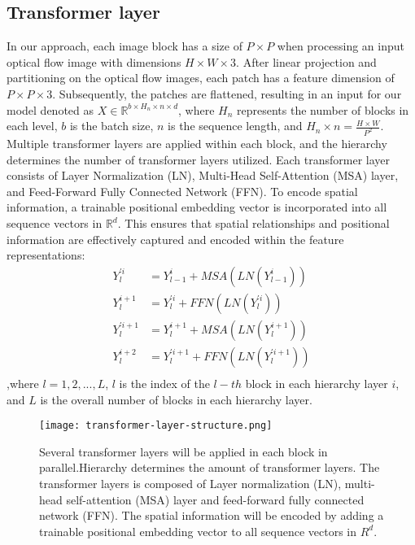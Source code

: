 \documentclass[review,12pt, 3p]{elsarticle}
\begin{document}
\subsection{Transformer layer}
In our approach, each image block has a size of $P \times P$ when processing an input optical flow image with dimensions $H \times W \times 3$. After linear projection and partitioning on the optical flow images, each patch has a feature dimension of $P \times P \times 3$. Subsequently, the patches are flattened, resulting in an input for our model denoted as $X \in \mathbb{R}^{b \times H_n \times n \times d}$, where $H_n$ represents the number of blocks in each level, $b$ is the batch size, $n$ is the sequence length, and $H_n \times n = \frac{H \times W}{P^2}$. Multiple transformer layers are applied within each block, and the hierarchy determines the number of transformer layers utilized. Each transformer layer consists of Layer Normalization (LN), Multi-Head Self-Attention (MSA) layer, and Feed-Forward Fully Connected Network (FFN). To encode spatial information, a trainable positional embedding vector is incorporated into all sequence vectors in $\mathbb{R}^d$. This ensures that spatial relationships and positional information are effectively captured and encoded within the feature representations:
\begin{equation}
\begin{aligned}
Y_l^{'i} &= Y_{l-1}^{i}  + MSA(LN(Y_{l-1}^{i} ))\\
Y_l^{i+1} &= Y_{l}^{'i}  + FFN(LN(Y_{l}^{'i} ))\\
Y_l^{'i+1} &= Y_{l}^{i+1}  + MSA(LN(Y_{l}^{i+1} ))\\
Y_l^{i+2} &= Y_{l}^{'i+1}  + FFN(LN(Y_{l}^{'i+1} ))\\
\end{aligned}
\label{transformer-layer-eqation1}
\end{equation}
,where $l= 1,2,..., L$, $l$ is the index of the $l-th$ block in each hierarchy layer $i$, and $L$ is the overall number of blocks in each hierarchy layer. \\
\begin{figure*}[t]
\centering
  \texttt{[image: transformer-layer-structure.png]}
  \caption{Several transformer layers will be applied in each block in parallel.Hierarchy determines the amount of transformer layers. The transformer layers is composed of Layer normalization (LN), multi-head self-attention (MSA) layer and feed-forward fully connected network (FFN). The spatial information will be encoded by adding a trainable positional embedding vector to all sequence vectors in $R^d$.}
  \label{transformer-layer-structure}
\end{figure*}
\end{document}
